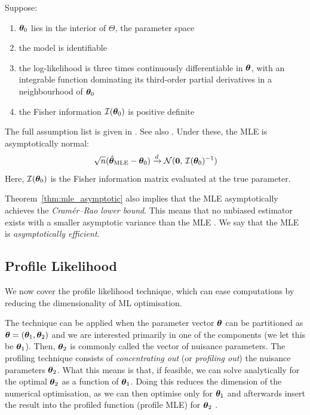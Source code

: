 \begin{theorem}
\label{thm:mle_asymptotic}
Suppose:
\begin{enumerate}
    \item[$(i)$] $\bm{\theta}_0$ lies in the interior of $\Theta$, the parameter space
    \item[$(ii)$] the model is identifiable
    \item[$(iii)$] the log-likelihood is three times continuously differentiable in $\bm{\theta}$, with an integrable function dominating its third-order partial derivatives in a neighbourhood of $\bm{\theta}_0$
    \item[$(iv)$] the Fisher information $\mathcal{I}(\bm{\theta}_0)$ is positive definite
\end{enumerate}
The full assumption list is given in \textcite[Misc.~10.6.2, p.~516, conditions (A1)--(A6)]{Casella2002}. See also \textcite[Thm.~5.39 and the conditions of Thm.~5.41, pp.~65--68]{vanderVaart1998}. Under these, the MLE is asymptotically normal:
\begin{equation}
    \sqrt{n}(\hat{\bm{\theta}}_{\text{MLE}} - \bm{\theta}_0) \xrightarrow{d} \mathcal{N}(\bm{0},\, \mathcal{I}(\bm{\theta}_0)^{-1})
\end{equation}
Here, $\mathcal{I}(\bm{\theta}_0)$ is the Fisher information matrix evaluated at the true parameter.
\end{theorem}

Theorem~\ref{thm:mle_asymptotic} also implies that the MLE asymptotically achieves the \emph{Cram\'er--Rao lower bound}. This means that no unbiased estimator exists with a smaller asymptotic variance than the MLE \parencite[Thm.~7.3.9, p.~335]{Casella2002}. We say that the MLE is \emph{asymptotically efficient}.

\subsection{Profile Likelihood}
\label{sec:bg:profile_likelihood}
We now cover the profile likelihood technique, which can ease computations by reducing the dimensionality of ML optimisation.

The technique can be applied when the parameter vector $\bm{\theta}$ can be partitioned as $\bm{\theta} = (\bm{\theta}_1, \bm{\theta}_2)$ and we are interested primarily in one of the components (we let this be $\bm{\theta}_1$). Then, $\bm{\theta}_2$ is commonly called the vector of nuisance parameters. The profiling technique consists of \emph{concentrating out} (or \emph{profiling out}) the nuisance parameters $\bm{\theta}_2$. What this means is that, if feasible, we can solve analytically for the optimal $\bm{\theta}_2$ as a function of $\bm{\theta}_1$. Doing this reduces the dimension of the numerical optimisation, as we can then optimise only for $\bm{\theta}_1$ and afterwards insert the result into the profiled function (profile MLE) for $\bm{\theta}_2$ \parencite[Sec.~3.1.1, p.~48]{LeSage2009}.


